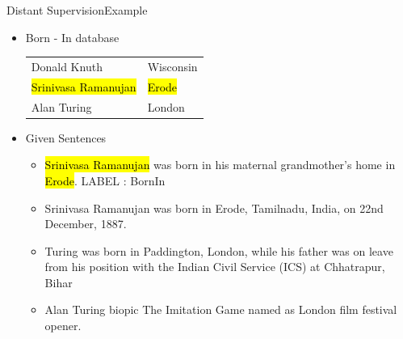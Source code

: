 \documentclass{beamer}
\makeatletter
\newcommand\SoulColor{%
  \let\set@color\beamerorig@set@color
  \let\reset@color\beamerorig@reset@color}
\makeatother
\begin{document}
\begin{frame}{Distant Supervision}{Example}
\begin{itemize}
 
\item Born - In database
 \begin{center}
\begin{tabular}{|l|l|}
\hline
Donald Knuth & Wisconsin \\
\SoulColor\hl{Srinivasa Ramanujan} & \SoulColor\hl{Erode} \\
Alan Turing & London \\
\hline
\end{tabular}
\end{center}
\item Given Sentences
\begin{itemize}
\item \alert<+> {\SoulColor\hl{Srinivasa Ramanujan} was born in his maternal grandmother’s home in \SoulColor\hl{Erode}.} \alert{LABEL : BornIn}
\item Srinivasa Ramanujan was born in Erode, Tamilnadu, India, on 22nd December, 1887.
\item Turing was born in Paddington, London, while his father was on leave from his position with the Indian Civil Service (ICS) at Chhatrapur, Bihar
\item Alan Turing biopic The Imitation Game named as London film festival opener.
\end{itemize}
\end{itemize}
 
\end{frame}
\end{document}
